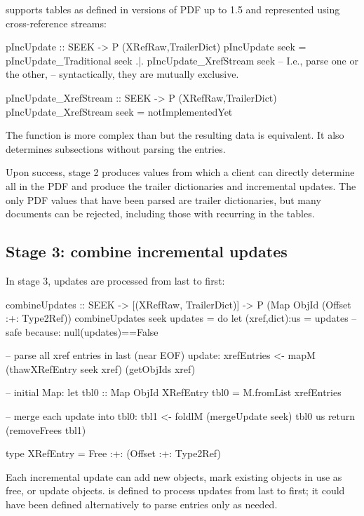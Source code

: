  supports \xref{} tables as defined in versions of PDF up to 1.5 and represented using cross-reference streams:
\begin{code}
pIncUpdate :: SEEK -> P (XRefRaw,TrailerDict)
pIncUpdate seek =
      pIncUpdate_Traditional seek
  .|. pIncUpdate_XrefStream seek
      -- I.e., parse one or the other,
      -- syntactically, they are mutually exclusive.

pIncUpdate_XrefStream :: SEEK -> P (XRefRaw,TrailerDict)
pIncUpdate_XrefStream seek = notImplementedYet
\end{code}
%
The function  is more
complex than  but the resulting
data is equivalent.
%
It also determines subsections without parsing the \xref{} entries.

Upon success, stage 2 produces values from which a client can directly determine all \objids{} in the PDF and produce the trailer dictionaries and incremental updates.
%
The only PDF values that have been parsed are trailer dictionaries, but many documents can be rejected, including those with recurring \objids{} in the \xref{} tables.

\subsection{Stage 3: combine incremental updates}
\label{sec:stage-3}
%
In stage 3, updates are processed from last to first:
\begin{code}
combineUpdates :: SEEK
               -> [(XRefRaw, TrailerDict)] 
               -> P (Map ObjId (Offset :+: Type2Ref))
combineUpdates seek updates =
    do
    let (xref,dict):us = updates -- safe because: null(updates)==False

    -- parse all xref entries in last (near EOF) update:
    xrefEntries <- mapM (thawXRefEntry seek xref) (getObjIds xref)

    -- initial Map:
    let tbl0 :: Map ObjId XRefEntry
        tbl0 = M.fromList xrefEntries

    -- merge each update into tbl0:
    tbl1  <- foldlM (mergeUpdate seek) tbl0 us
    return (removeFrees tbl1)

type XRefEntry = Free :+: (Offset :+: Type2Ref)
\end{code}

Each incremental update can add new objects, mark existing objects in use as free, or update objects.
%
 is defined to process updates from last to first;
%
it could have been defined alternatively to parse \xref{} entries only as needed.
%

